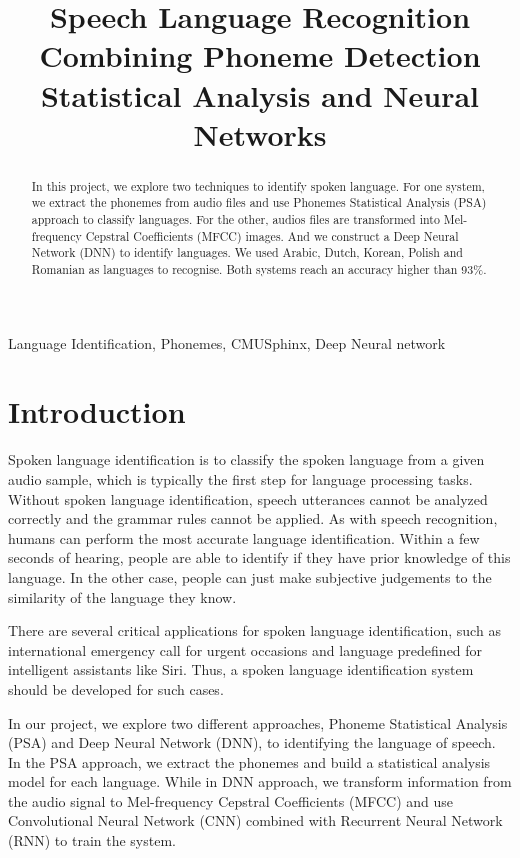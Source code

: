 \documentclass{article}
\title{Speech Language Recognition Combining Phoneme Detection Statistical Analysis and Neural Networks}
\begin{document}
%
\maketitle
%
\begin{abstract}
In this project, we explore two techniques to identify spoken language. For one system, we extract the phonemes from audio files and use Phonemes Statistical Analysis (PSA) approach to classify languages. For the other, audios files are transformed into Mel-frequency Cepstral Coefficients (MFCC) images. And we construct a Deep Neural Network (DNN) to identify languages. We used Arabic, Dutch, Korean, Polish and Romanian as languages to recognise. Both systems reach an accuracy higher than 93\%.
\end{abstract}
\begin{keywords}
Language Identification, Phonemes, CMUSphinx, Deep Neural network
\end{keywords}
%
\section{Introduction}
\label{sec:intro}
Spoken language identification is to classify the spoken language from a given audio sample, which is typically the first step for language processing tasks. Without spoken language identification, speech utterances cannot be analyzed correctly and the grammar rules cannot be applied. As with speech recognition, humans can perform the most accurate language identification.\cite{shi2006importance} Within a few seconds of hearing, people are able to identify if they have prior knowledge of this language. In the other case, people can just make subjective judgements to the similarity of the language they know.

There are several critical applications for spoken language identification, such as international emergency call for urgent occasions and language predefined for intelligent assistants like Siri. 
Thus, a spoken language identification system should be developed for such cases.

In our project, we explore two different approaches, Phoneme Statistical Analysis (PSA) and Deep Neural Network (DNN), to identifying the language of speech. In the PSA approach, we extract the phonemes and build a statistical analysis model for each language. While in DNN approach, we transform information from the audio signal to Mel-frequency Cepstral Coefficients (MFCC) and use Convolutional Neural Network (CNN) combined with Recurrent Neural Network (RNN) to train the system.
\end{document}
